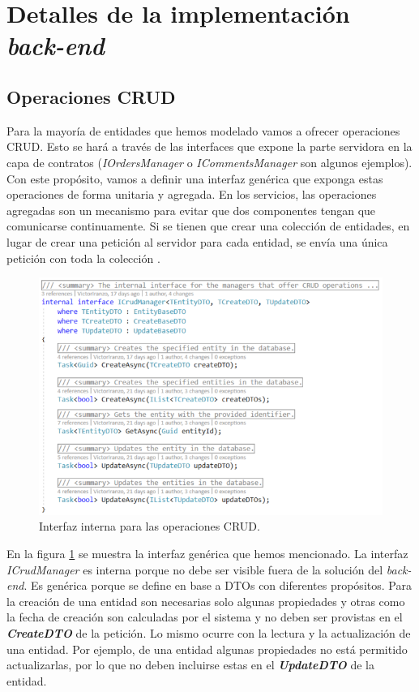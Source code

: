 \documentclass[11pt,spanish,listoffigures]{tfgetsinf}
\begin{document}
\newpage

\section{Detalles de la implementación \textit{back-end}}

\subsection{Operaciones CRUD} \label{subsect:CRUD}

Para la mayoría de entidades que hemos modelado vamos a ofrecer operaciones CRUD. Esto se hará a través de las interfaces que expone la parte servidora en la capa de contratos (\textit{IOrdersManager} o \textit{ICommentsManager} son algunos ejemplos). Con este propósito, vamos a definir una interfaz genérica que exponga estas operaciones de forma unitaria y agregada. En los servicios, las operaciones agregadas son un mecanismo para evitar que dos componentes tengan que comunicarse continuamente. Si se tienen que crear una colección de entidades, en lugar de crear una petición al servidor para cada entidad, se envía una única petición con toda la colección \cite{Newman2015a}.

\begin{figure}[h]
\centering
\includegraphics[scale=0.8]{ICrudManager}
\caption{Interfaz interna para las operaciones CRUD.}
\label{fig:ICrudManager}
\end{figure}

En la figura \ref{fig:ICrudManager} se muestra la interfaz genérica que hemos mencionado. La interfaz \textit{ICrudManager} es interna porque no debe ser visible fuera de la solución del \textit{back-end}. Es genérica porque se define en base a DTOs con diferentes propósitos. Para la creación de una entidad son necesarias solo algunas propiedades y otras como la fecha de creación son calculadas por el sistema y no deben ser provistas en el \textbf{\textit{CreateDTO}} de la petición. Lo mismo ocurre con la lectura y la actualización de una entidad. Por ejemplo, de una entidad algunas propiedades no está permitido actualizarlas, por lo que no deben incluirse estas en el \textbf{\textit{UpdateDTO}} de la entidad. 
\end{document}
